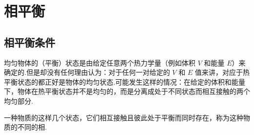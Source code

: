 %
\chapter{相平衡}

\section{相平衡条件}

均匀物体的（平衡）状态是由给定任意两个热力学量（例如体积 $V$ 和能量 $E$）来确定的.但是却没有任何理由认为：对于任何一对给定的 $V$ 和 $E$ 值来讲，对应于热平衡状态的都正好是物体的均匀状态.可能发生这样的情况：在给定的体积和能量下，物体在热平衡状态并不是均匀的，而是分离成处于不同状态而相互接触的两个均匀部分.

一种物质的这样几个状态，它们相互接触且彼此处于平衡而同时存在，称为这种物质的不同的相.

